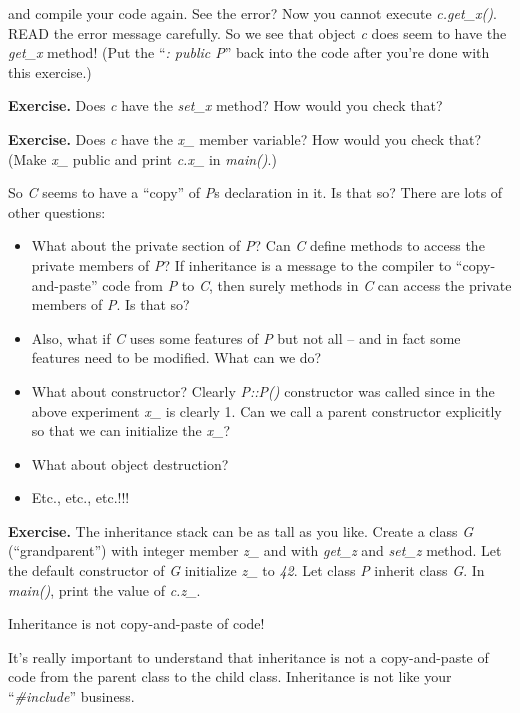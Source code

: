\documentclass[
]{article}
\providecommand{\tightlist}{%
  \setlength{\itemsep}{0pt}\setlength{\parskip}{0pt}}
\begin{document}
and compile your code again. See the error? Now you cannot execute
\emph{c.get\_x()}. READ the error message carefully. So we see that
object \emph{c} does seem to have the \emph{get\_x} method! (Put the
``\emph{: public P}'' back into the code after you're done with this
exercise.)

\textbf{Exercise.} Does \emph{c} have the \emph{set\_x} method? How
would you check that?

\textbf{Exercise.} Does \emph{c} have the \emph{x\_} member variable?
How would you check that? (Make \emph{x\_} public and print \emph{c.x\_}
in \emph{main()}.)

So \emph{C} seems to have a ``copy'' of \emph{P}\textquotesingle s
declaration in it. Is that so? There are lots of other questions:

\begin{itemize}
\tightlist
\item
  What about the private section of \emph{P}? Can \emph{C} define
  methods to access the private members of \emph{P}? If inheritance is a
  message to the compiler to ``copy-and-paste'' code from \emph{P }to
  \emph{C}, then surely methods in \emph{C }can access the private
  members of \emph{P}. Is that so?
\item
  Also, what if \emph{C} uses some features of \emph{P} but not all --
  and in fact some features need to be modified. What can we do?
\item
  What about constructor? Clearly \emph{P::P()} constructor was called
  since in the above experiment \emph{x\_ }is clearly 1. Can we call a
  parent constructor explicitly so that we can initialize the
  \emph{x\_}?
\item
  What about object destruction?
\item
  Etc., etc., etc.!!!
\end{itemize}

\textbf{Exercise.} The inheritance stack can be as tall as you like.
Create a class \emph{G} (``grandparent'') with integer member \emph{z\_}
and with \emph{get\_z} and \emph{set\_z} method. Let the default
constructor of \emph{G} initialize \emph{z\_} to \emph{42}. Let class
\emph{P} inherit class \emph{G}. In \emph{main()}, print the value of
\emph{c.z\_}.

Inheritance is not copy-and-paste of code!

It's really important to understand that inheritance is not a
copy-and-paste of code from the parent class to the child class.
Inheritance is not like your ``\emph{\#include}'' business.
\end{document}
